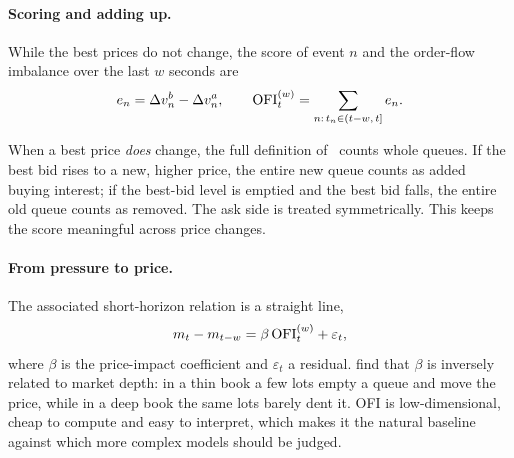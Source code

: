 \paragraph{Scoring and adding up.} While the best prices do not change, the score of event $n$
and the order-flow imbalance over the last $w$ seconds are
\begin{equation}
  e_n = \Delta v^{b}_{n} - \Delta v^{a}_{n},
  \qquad
  \mathrm{OFI}^{(w)}_t = \sum_{n:\, t_n \in (t-w,\, t]} e_n .
\end{equation}

When a best price \emph{does} change, the full definition of~\citet{cks2014} counts whole queues.
If the best bid rises to a new, higher price, the entire new queue counts as added buying interest;
if the best-bid level is emptied and the best bid falls, the entire old queue counts as removed. The
ask side is treated symmetrically. This keeps the score meaningful across price changes.

\paragraph{From pressure to price.} The associated short-horizon relation is a straight line,
\begin{equation}
  m_t - m_{t-w} = \beta\, \mathrm{OFI}^{(w)}_t + \varepsilon_t,
\end{equation}
where $\beta$ is the price-impact coefficient and $\varepsilon_t$ a residual.
\citet{cks2014} find that $\beta$ is inversely related to market depth: in a thin book a few lots
empty a queue and move the price, while in a deep book the same lots barely dent it. OFI is
low-dimensional, cheap to compute and easy to interpret, which makes it the natural baseline
against which more complex models should be judged.

